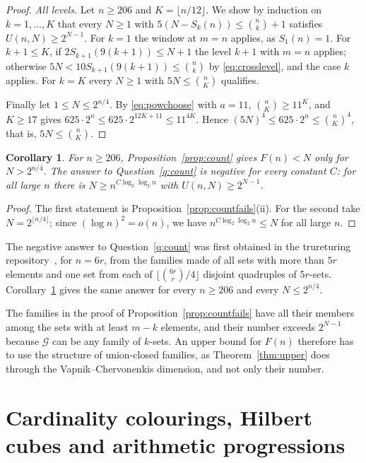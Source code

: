 \documentclass[11pt,reqno]{amsart}
\numberwithin{equation}{section}
\theoremstyle{plain}
\newtheorem{corollary}[theorem]{Corollary}
\theoremstyle{definition}
\theoremstyle{remark}
\newcommand{\cG}{\mathcal{G}}
\begin{document}
\begin{proof}
\emph{All levels.} Let $n\ge206$ and $K=\lfloor n/12\rfloor$. We show by
induction on $k=1,\dots,K$ that every $N\ge1$ with $5(N-S_k(n))\le
\binom nk+1$ satisfies $U(n,N)\ge2^{N-1}$. For $k=1$ the window at $m=n$
applies, as $S_1(n)=1$. For $k+1\le K$, if $2S_{k+1}(9(k+1))\le N+1$ the
level $k+1$ with $m=n$ applies; otherwise $5N<10S_{k+1}(9(k+1))\le
\binom nk$ by \eqref{eq:crosslevel}, and the case $k$ applies. For $k=K$
every $N\ge1$ with $5N\le\binom nK$ qualifies.

Finally let $1\le N\le2^{n/4}$. By \eqref{eq:powchoose} with $a=11$,
$\binom nK\ge11^{K}$, and $K\ge17$ gives $625\cdot2^{n}\le
625\cdot2^{12K+11}\le11^{4K}$. Hence $(5N)^{4}\le625\cdot2^{n}\le
\binom nK^{4}$, that is, $5N\le\binom nK$.
\end{proof}

\begin{corollary}
\label{cor:countfails}
For $n\ge206$, Proposition~\ref{prop:count} gives $F(n)<N$ only for
$N>2^{n/4}$. The answer to Question~\ref{q:count} is negative for every
constant $C$: for all large $n$ there is $N\ge n^{C\log_2\log_2n}$ with
$U(n,N)\ge2^{N-1}$.
\end{corollary}

\begin{proof}
The first statement is Proposition~\ref{prop:countfails}(ii). For the
second take $N=2^{\lfloor n/4\rfloor}$; since $(\log n)^{2}=o(n)$, we have
$n^{C\log_2\log_2n}\le N$ for all large $n$.
\end{proof}

The negative answer to Question~\ref{q:count} was first obtained in the
trureturing repository~\cite{Tr26}, for $n=6r$, from the families made of
all sets with more than $5r$ elements and one set from each of
$\lfloor\binom{6r}{r}/4\rfloor$ disjoint quadruples of $5r$-sets.
Corollary~\ref{cor:countfails} gives the same answer for every $n\ge206$
and every $N\le2^{n/4}$.

The families in the proof of Proposition~\ref{prop:countfails} have all
their members among the sets with at least $m-k$ elements, and their
number exceeds $2^{N-1}$ because $\cG$ can be any family of $k$-sets. An
upper bound for $F(n)$ therefore has to use the structure of
union-closed families, as Theorem~\ref{thm:upper} does through the
Vapnik--Chervonenkis dimension, and not only their number.

\section{Cardinality colourings, Hilbert cubes and arithmetic progressions}
\label{sec:card}
\end{document}
